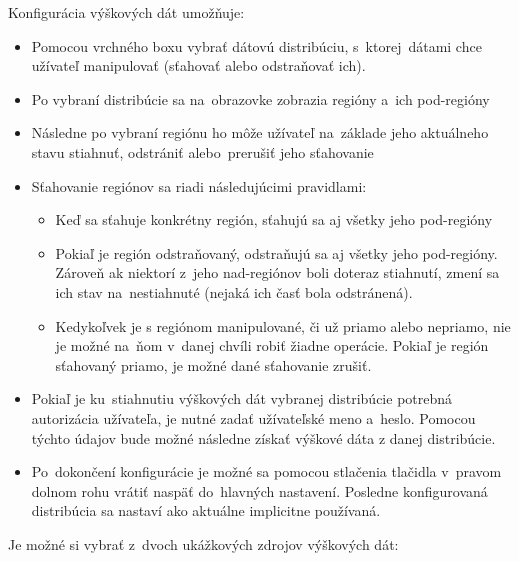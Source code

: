 \documentclass[12pt,a4paper]{report}
\begin{document}
Konfigurácia výškových dát umožňuje:
\begin{itemize}
    \item Pomocou vrchného boxu vybrať dátovú distribúciu, s~ktorej~dátami chce užívateľ manipulovať (sťahovať alebo odstraňovať ich).
    \item Po vybraní distribúcie sa na~obrazovke zobrazia regióny a~ich pod-regióny
    \item Následne po vybraní regiónu ho môže užívateľ na~základe jeho aktuálneho stavu stiahnuť, odstrániť alebo~prerušiť jeho sťahovanie
    \item Sťahovanie regiónov sa riadi následujúcimi pravidlami:
    \begin{itemize}
        \item Keď sa sťahuje konkrétny región, sťahujú sa aj všetky jeho pod-regióny
        \item Pokiaľ je región odstraňovaný, odstraňujú sa aj všetky jeho pod-regióny. Zároveň ak niektorí z~jeho nad-regiónov boli doteraz stiahnutí, zmení sa ich stav na~nestiahnuté (nejaká ich časť bola odstránená).
        \item Kedykoľvek je s regiónom manipulované, či už priamo alebo nepriamo, nie je možné na~ňom v~danej chvíli robiť žiadne operácie. Pokiaľ je región sťahovaný priamo, je možné dané sťahovanie zrušiť.
    \end{itemize}
    \item Pokiaľ je ku~stiahnutiu výškových dát vybranej distribúcie potrebná autorizácia užívateľa, je nutné zadať užívateľské meno a~heslo. Pomocou týchto údajov bude možné následne získať výškové dáta z danej distribúcie.
    \item Po~dokončení konfigurácie je možné sa pomocou stlačenia tlačidla v~pravom dolnom rohu vrátiť naspäť do~hlavných nastavení. Posledne konfigurovaná distribúcia sa nastaví ako aktuálne implicitne používaná.
\end{itemize}
Je možné si vybrať z~dvoch ukážkových zdrojov výškových dát:
\end{document}
